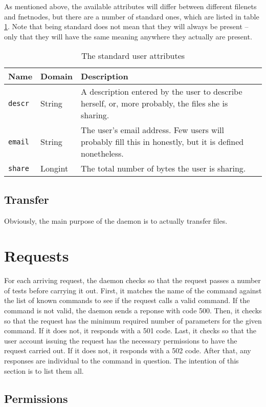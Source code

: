 \documentclass[twoside,a4paper,11pt]{article}
\begin{document}
As mentioned above, the available attributes will differ between
different filenets and fnetnodes, but there are a number of standard
ones, which are listed in table \ref{tab:std-attrs}. Note that being
standard does not mean that they will always be present -- only that
they will have the same meaning anywhere they actually are present.

\begin{table}
  \begin{longtable}{ll|p{3in}}
    Name & Domain & Description \\
    \hline
    \texttt{descr} & String &
    A description entered by the user to
    describe herself, or, more probably, the files she is sharing.
    \\
    \texttt{email} & String &
    The user's email address. Few users will
    probably fill this in honestly, but it is defined nonetheless.
    \\
    \texttt{share} & Longint &
    The total number of bytes the user is sharing.
  \end{longtable}
  \caption{The standard user attributes}
  \label{tab:std-attrs}
\end{table}

\subsection{Transfer}
\label{transfer}
Obviously, the main purpose of the daemon is to actually transfer
files.

\section{Requests}

For each arriving request, the daemon checks so that the request
passes a number of tests before carrying it out. First, it matches the
name of the command against the list of known commands to see if the
request calls a valid command. If the command is not valid, the daemon
sends a reponse with code 500. Then, it checks so that the request has
the minimum required number of parameters for the given command. If it
does not, it responds with a 501 code. Last, it checks so that the
user account issuing the request has the necessary permissions to have
the request carried out. If it does not, it responds with a 502
code. After that, any responses are individual to the command in
question. The intention of this section is to list them all.

\subsection{Permissions}
\end{document}
